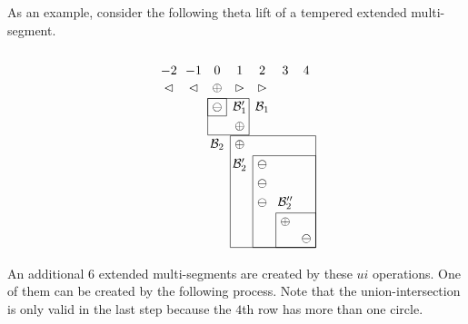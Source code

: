 \documentclass[11pt,letterpaper]{amsart}
\newcommand{\BB}{\mathcal{B}}
\numberwithin{equation}{section}
\begin{document}
As an example, consider the following theta lift of a tempered extended multi-segment.
\[\begin{tikzpicture}[baseline=(current bounding box.north)]
  \matrix (m)[matrix of math nodes, nodes in empty cells] {
    -2 & -1 & 0 & 1 & 2 & 3 & 4 \\
    \lhd & \lhd & \oplus & \rhd & \rhd & & \\
    & & \ominus & \BB_1' & \BB_1 & & \\
    & & & \oplus & & & \\
    & & \BB_2 & \oplus & & & \\
    & & & \BB_2' & \ominus & & \\
    & & & & \ominus & & \\
    & & & & \ominus & \BB_2'' & \\
    & & & & & \oplus & \\
    & & & & & & \ominus \\
  } ;
  \draw (m-3-3.north west) rectangle (m-4-4.south east);
  \draw (m-3-3.north west) rectangle (m-3-3.south east);
  \draw (m-5-4.north west) rectangle (m-10-7.south east);
  \draw (m-6-5.north west) rectangle (m-10-7.south east);
  \draw (m-9-6.north west) rectangle (m-10-7.south east);
\end{tikzpicture}\]

An additional $6$ extended multi-segments are created by these $ui$ operations. One of them can be created by the following process. Note that the union-intersection is only valid in the last step because the $4$th row has more than one circle.
\end{document}
